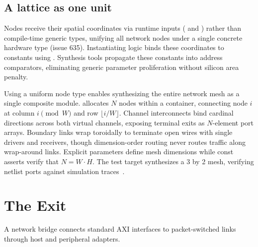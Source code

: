 \documentclass[journal,9pt]{IEEEtran}
\newcommand{\nocpart}[4]{%
}
\begin{document}
\nocpart{switch.rs}{pick}{Round-robin arbiter rotations across \code{turn} states.}{lst:n-pick}

\nocpart{switch.rs}{run}{Cycle-by-cycle switch execution.}{lst:n-switch}

\nocpart{node.rs}{run}{Node definition containing dual virtual channel switches.}{lst:n-node}

\subsection{A lattice as one unit}
\label{sec:n-mesh}

Nodes receive their spatial coordinates via runtime inputs ( and
) rather than compile-time generic types, unifying all network nodes
under a single concrete hardware type (issue 635). Instantiating logic binds
these coordinates to constants using . Synthesis tools propagate
these constants into address comparators, eliminating generic parameter
proliferation without silicon area penalty.

Using a uniform node type enables synthesizing the entire network mesh as a
single composite module.  allocates \(N\) nodes
within a  container, connecting node \(i\) at column \(i \pmod W\)
and row \(\lfloor i / W \rfloor\). Channel interconnects bind cardinal
directions across both virtual channels, exposing terminal exits as \(N\)-element
port arrays. Boundary links wrap toroidally to terminate open wires with
single drivers and receivers, though dimension-order routing never routes
traffic along wrap-around links. Explicit parameters define mesh dimensions
while const asserts verify that \(N = W \cdot H\). The test target 
synthesizes a 3 by 2 mesh, verifying netlist ports against simulation
traces~\cite{examples}.

\nocpart{mesh.rs}{mesh}{Lattice constructor wiring nodes as a composite unit.}{lst:n-mesh}

\section{The Exit}
\label{sec:n-bridge}

A network bridge connects standard AXI interfaces to packet-switched links
through host and peripheral adapters.
\end{document}
